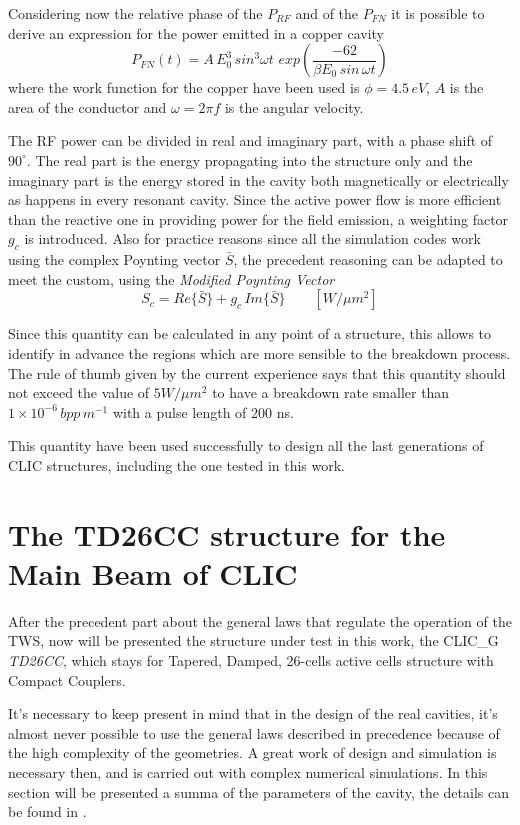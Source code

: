 Considering now the relative phase of the $P_{RF}$ and of the $P_{FN}$ it is possible to derive an expression for the power emitted in a copper cavity
\begin{equation}
P_{FN} (t) = A \, E^3_0 \, sin^3 \omega t \,  \, exp \left ( \frac{-62}{\beta E_0 \, sin \, \omega t} \right )
\end{equation}
where the work function for the copper have been used is $\phi = 4.5 \, eV$, $A$ is the area of the conductor and $\omega = 2 \pi f$ is the angular velocity.

The RF power can be divided in real and imaginary part, with a phase shift of $90^\circ$. The real part is the energy propagating into the structure only and the imaginary part is the energy stored in the cavity both magnetically or electrically as happens in every resonant cavity. Since the active power flow is more efficient than the reactive one in providing power for the field emission, a weighting factor $g_c$ is introduced. Also for practice reasons since all the simulation codes work using the complex Poynting vector $\bar{S}$, the precedent reasoning can be adapted to meet the custom, using the \textit{Modified Poynting Vector}
\begin{equation}
S_c = Re\{ \bar{S} \} + g_c \, Im \{ \bar{S} \} \qquad [W/\mu m^2]
\end{equation} 

Since this quantity can be calculated in any point of a structure, this allows to identify in advance the regions which are more sensible to the breakdown process. The rule of thumb given by the current experience says that this quantity should not exceed the value of $5 W/\mu m^2$ to have a breakdown rate smaller than $1\times 10^{-6} \, bpp \, m^{-1}$ with a pulse length of 200 ns.

This quantity have been used successfully to design all the last generations of CLIC structures, including the one tested in this work.






\section[The TD26CC structure for the Main Beam of CLIC]{The TD26CC structure for the Main Beam of CLIC}

After the precedent part about the general laws that regulate the operation of the TWS, now will be presented the structure under test in this work, the CLIC\_G \textit{TD26CC}, which stays for Tapered, Damped, 26-cells active cells structure with Compact Couplers.

It's necessary to keep present in mind that in the design of the real cavities, it's almost never possible to use the general laws described in precedence because of the high complexity of the geometries. A great work of design and simulation is necessary then, and is carried out with complex numerical simulations. In this section will be presented a summa of the parameters of the cavity, the details can be found in \cite{CLIC:cdr,Grudiev:td26cc,Lunin:1333709}.








